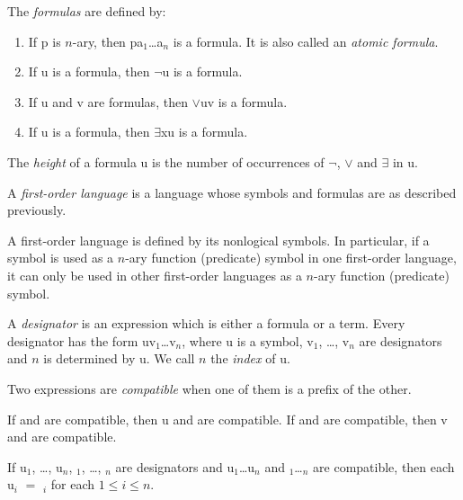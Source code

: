 \begin{definition}
	The \emph{formulas} are defined by:
	\begin{enumerate}
		\item If \synt p is $n$-ary, then \synt p\synt a$_1$\dots\synt a$_n$ is a formula.
		It is also called an \emph{atomic formula}.
		\item If \synt u is a formula, then $\lnot$\synt u is a formula.
		\item If \synt u and \synt v are formulas, then $\lor$\synt u\synt v is a formula.
		\item If \synt u is a formula, then $\exists$\synt x\synt u is a formula.
	\end{enumerate}
\end{definition}

\begin{definition}
	The \emph{height} of a formula \synt u is the number of occurrences of $\lnot$,
	$\lor$ and $\exists$ in \synt u.
\end{definition}

\begin{definition}
	A \emph{first-order language} is a language whose symbols and formulas are as
	described previously.
\end{definition}

\begin{remark}
	A first-order language is defined by its nonlogical symbols. In particular,
	if a symbol is used as a $n$-ary function (predicate) symbol in one 
	first-order language, it can only be used in other first-order languages
	as a $n$-ary function (predicate) symbol.
\end{remark}

\begin{definition}
	A \emph{designator} is an expression which is either a formula or a term.
	Every designator has the form \synt u\synt v$_1$\dots\synt v$_n$, where
	\synt u is a symbol, \synt v$_1$, \dots, \synt v$_n$ are designators and 
	$n$ is determined by \synt u. We call $n$ the \emph{index} of \synt u.
\end{definition}

\begin{definition}
	Two expressions are \emph{compatible} when one of them is a prefix
	of the other.
\end{definition}

\begin{fact}
	If  and  are compatible, then \synt u and  are
	compatible. If  and  are compatible, then \synt v
	and  are compatible.
\end{fact}

\begin{lemma}
	If \synt u$_1$, \dots, \synt u$_n$, $_1$, \dots, $_n$ are designators
	and \synt u$_1$\dots\synt u$_n$ and $_1$\dots{}$_n$ are compatible,
	then each \synt u$_i$ $=$ $_i$ for each $1 \le i \le n$.
\end{lemma}